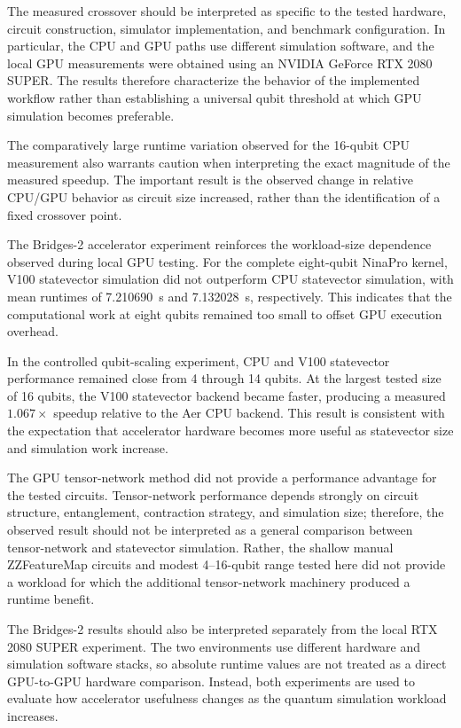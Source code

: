 \documentclass[pdflatex,sn-mathphys-num]{sn-jnl}%
\theoremstyle{thmstyleone}%
\theoremstyle{thmstyletwo}%
\theoremstyle{thmstylethree}%
\begin{document}
The measured crossover should be interpreted as specific to the tested
hardware, circuit construction, simulator implementation, and benchmark
configuration. In particular, the CPU and GPU paths use different simulation
software, and the local GPU measurements were obtained using an NVIDIA
GeForce RTX 2080 SUPER. The results therefore characterize the behavior of the
implemented workflow rather than establishing a universal qubit threshold at
which GPU simulation becomes preferable.

The comparatively large runtime variation observed for the 16-qubit CPU
measurement also warrants caution when interpreting the exact magnitude of the
measured speedup. The important result is the observed change in relative
CPU/GPU behavior as circuit size increased, rather than the identification of a
fixed crossover point.

The Bridges-2 accelerator experiment reinforces the workload-size dependence
observed during local GPU testing. For the complete eight-qubit NinaPro
kernel, V100 statevector simulation did not outperform CPU statevector
simulation, with mean runtimes of 7.210690~s and 7.132028~s, respectively.
This indicates that the computational work at eight qubits remained too small
to offset GPU execution overhead.

In the controlled qubit-scaling experiment, CPU and V100 statevector
performance remained close from 4 through 14 qubits. At the largest tested
size of 16 qubits, the V100 statevector backend became faster, producing a
measured \(1.067\times\) speedup relative to the Aer CPU backend. This result
is consistent with the expectation that accelerator hardware becomes more
useful as statevector size and simulation work increase.

The GPU tensor-network method did not provide a performance advantage for the
tested circuits. Tensor-network performance depends strongly on circuit
structure, entanglement, contraction strategy, and simulation size; therefore,
the observed result should not be interpreted as a general comparison between
tensor-network and statevector simulation. Rather, the shallow manual
ZZFeatureMap circuits and modest 4--16-qubit range tested here did not provide
a workload for which the additional tensor-network machinery produced a
runtime benefit.

The Bridges-2 results should also be interpreted separately from the local
RTX 2080 SUPER experiment. The two environments use different hardware and
simulation software stacks, so absolute runtime values are not treated as a
direct GPU-to-GPU hardware comparison. Instead, both experiments are used to
evaluate how accelerator usefulness changes as the quantum simulation workload
increases.
\end{document}

